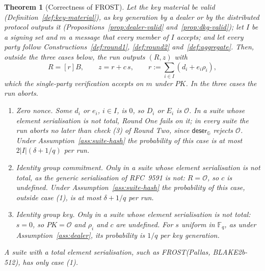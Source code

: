 \documentclass[11pt,a4paper]{article}
\newtheorem{theorem}{Theorem}[section]
\theoremstyle{definition}
\newcommand{\F}{\mathbb{F}}
\newcommand{\G}{\mathbb{G}}
\newcommand{\Fq}{\F_q}
\begin{document}
\begin{theorem}[Correctness of FROST]\label{thm:frost-correct}
Let the key material be valid (Definition~\ref{def:key-material}), as key
generation by a dealer or by the distributed protocol outputs it
(Propositions~\ref{prop:dealer-valid} and~\ref{prop:dkg-valid}); let \(I\)
be a signing set and \(m\) a message that every member of \(I\) accepts;
and let every party follow Constructions~\ref{def:round1},
\ref{def:round2} and~\ref{def:aggregate}. Then, outside the three cases
below, the run outputs \((R, z)\) with
\[
  R = [r]B , \qquad z = r + c\, s , \qquad
  r := \sum_{i \in I} (d_i + e_i \rho_i) ,
\]
which the single-party verification accepts on \(m\) under \(\mathit{PK}\).
In the three cases the run aborts.
\begin{enumerate}
\item[(1)] \emph{Zero nonce.} Some \(d_i\) or \(e_i\), \(i \in I\), is
  \(0\), so \(D_i\) or \(E_i\) is \(\mathcal{O}\). In a suite whose element
  serialisation is not total, Round One fails on it; in every suite the
  run aborts no later than check (3) of Round Two, since
  \(\mathsf{deser}_{\G}\) rejects \(\mathcal{O}\). Under
  Assumption~\ref{ass:suite-hash} the probability of this case is at
  most \(2 \lvert I \rvert (\delta + 1/q)\) per run.
\item[(2)] \emph{Identity group commitment.} Only in a suite whose element
  serialisation is not total, as the generic serialisation of RFC~9591 is
  not: \(R = \mathcal{O}\), so \(c\) is undefined. Under
  Assumption~\ref{ass:suite-hash} the probability of this case, outside
  case (1), is at most \(\delta + 1/q\) per run.
\item[(3)] \emph{Identity group key.} Only in a suite whose element
  serialisation is not total: \(s = 0\), so \(\mathit{PK} = \mathcal{O}\)
  and \(\rho_i\) and \(c\) are undefined. For \(s\) uniform in \(\Fq\), as
  under Assumption~\ref{ass:dealer}, its probability is \(1/q\) per key
  generation.
\end{enumerate}
A suite with a total element serialisation, such as
FROST(Pallas, BLAKE2b-512), has only case (1).
\end{theorem}
\end{document}
